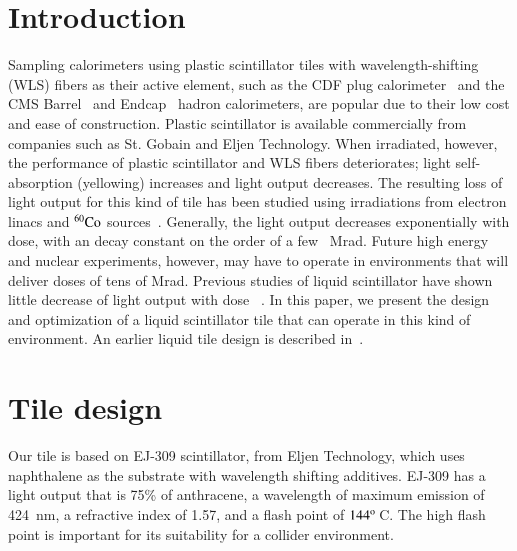 \documentclass[review]{elsarticle}
\begin{document}
\linenumbers

\section{Introduction}
Sampling calorimeters using plastic scintillator tiles with
wavelength-shifting (WLS) fibers as their active element, such as the CDF plug
calorimeter~\cite{Aota1995557} and the CMS Barrel~\cite{CMSHB} and
Endcap~\cite{HCALTDR1997} hadron calorimeters, are popular due to their
low cost and ease of construction. Plastic scintillator is available
commercially from companies such as St. Gobain and Eljen Technology. When
irradiated, however, the performance of plastic scintillator and WLS
fibers deteriorates; light self-absorption (yellowing) increases and
light output decreases. The resulting loss of light output for this
kind of tile has been studied using irradiations
from electron linacs and ${\rm ^{60}Co}$ sources~\cite{vasken,ByonWagner1993263}.
Generally, the light output decreases exponentially with dose, with an
decay constant on the order of a few~ Mrad. Future high energy and nuclear
experiments, however, may have to operate in environments that will
deliver doses of tens of Mrad.
Previous studies of liquid scintillator have shown little decrease
of light output with dose ~\cite{zornliquid,Klein1967399,berlman}.
In this paper, we present the design
and optimization of a liquid scintillator tile
that can operate in this kind of environment.
An earlier liquid tile design is described in~\cite{liquidrandy}.

\section{Tile design}
\label{sec:design}
Our tile is based on EJ-309 scintillator, from Eljen Technology, which
uses naphthalene as the substrate with wavelength shifting additives.
EJ-309 has a light output that is 75\% of anthracene, a wavelength of
maximum emission of 424~nm, a refractive index of 1.57, and a flash
point of $\rm{144^o}$\,C. The high flash point is important for its
suitability for a collider environment.
\end{document}
